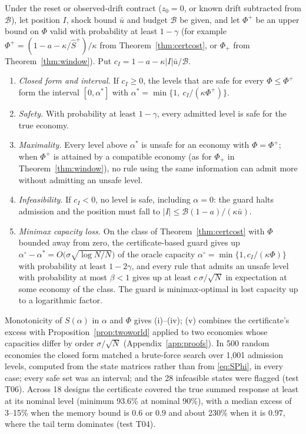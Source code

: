 \begin{theorem}\label{thm:robustguard}
Under the reset or observed-drift contract ($z_0=0$, or known drift subtracted from $\mathcal B$), let position $I$, shock bound $\bar u$ and budget $\mathcal B$ be given, and let $\Phi^+$ be an upper bound on $\Phi$ valid with probability at least $1-\gamma$ (for example $\Phi^+=(1-a-\kappa/\hat S^+)/\kappa$ from Theorem~\ref{thm:certcost}, or $\Phi_+$ from Theorem~\ref{thm:window}). Put $c_I=1-a-\kappa|I|\bar u/\mathcal B$.
\begin{enumerate}[label=(\roman*)]
\item \emph{Closed form and interval.} If $c_I\ge0$, the levels that are safe for every $\Phi\le\Phi^+$ form the interval $[0,\alpha^*]$ with $\alpha^*=\min\{1,\ c_I/(\kappa\Phi^+)\}$.
\item \emph{Safety.} With probability at least $1-\gamma$, every admitted level is safe for the true economy.
\item \emph{Maximality.} Every level above $\alpha^*$ is unsafe for an economy with $\Phi=\Phi^+$; when $\Phi^+$ is attained by a compatible economy (as for $\Phi_+$ in Theorem~\ref{thm:window}), no rule using the same information can admit more without admitting an unsafe level.
\item \emph{Infeasibility.} If $c_I<0$, no level is safe, including $\alpha=0$: the guard halts admission and the position must fall to $|I|\le\mathcal B(1-a)/(\kappa\bar u)$.
\item \emph{Minimax capacity loss.} On the class of Theorem~\ref{thm:certcost} with $\Phi$ bounded away from zero, the certificate-based guard gives up $\alpha^\circ-\alpha^*=O\bigl(\sigma\sqrt{\log N/N}\bigr)$ of the oracle capacity $\alpha^\circ=\min\{1,c_I/(\kappa\Phi)\}$ with probability at least $1-2\gamma$, and every rule that admits an unsafe level with probability at most $\beta<1$ gives up at least $c\,\sigma/\sqrt N$ in expectation at some economy of the class. The guard is minimax-optimal in lost capacity up to a logarithmic factor.
\end{enumerate}
\end{theorem}

Monotonicity of $S(\alpha)$ in $\alpha$ and $\Phi$ gives (i)--(iv); (v) combines the certificate's excess with Proposition~\ref{prop:twoworld} applied to two economies whose capacities differ by order $\sigma/\sqrt N$ (Appendix~\ref{app:proofs}). In 500 random economies the closed form matched a brute-force search over 1{,}001 admission levels, computed from the state matrices rather than from \eqref{eq:SPhi}, in every case; every safe set was an interval; and the 28 infeasible states were flagged (test T06). Across 18 designs the certificate covered the true summed response at least at its nominal level (minimum 93.6\% at nominal 90\%), with a median excess of 3--15\% when the memory bound is $0.6$ or $0.9$ and about 230\% when it is $0.97$, where the tail term dominates (test T04).

